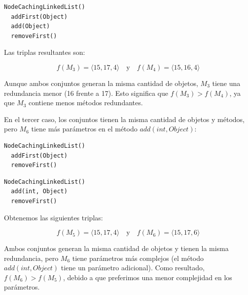 \begin{lstlisting}[numbers=none,label=fig:NCLbuilders4, caption=Conjunto de métodos \( M_4 \)]
  NodeCachingLinkedList()
  addFirst(Object)
  add(Object)
  removeFirst()
\end{lstlisting}

Las triplas resultantes son:

\[
f(M_3) = \langle 15, 17, 4 \rangle \quad \text{y} \quad f(M_4) = \langle 15, 16, 4 \rangle
\]

Aunque ambos conjuntos generan la misma cantidad de objetos, \( M_3 \) tiene una redundancia menor (16 frente a 17). Esto significa que \( f(M_3) > f(M_4) \), ya que \( M_3 \) contiene menos métodos redundantes.

En el tercer caso, los conjuntos tienen la misma cantidad de objetos y métodos, pero \( M_6 \) tiene más parámetros en el método \( add(int, Object) \):\\

\begin{lstlisting}[numbers=none,label=fig:NCLbuilders5, caption=Conjunto de métodos \( M_5 \)]
  NodeCachingLinkedList()
  addFirst(Object)
  removeFirst()
\end{lstlisting}

\begin{lstlisting}[numbers=none,label=fig:NCLbuilders6, caption=Conjunto de métodos \( M_6 \)]
  NodeCachingLinkedList()
  add(int, Object)
  removeFirst()
\end{lstlisting}

Obtenemos las siguientes triplas:

\[
f(M_5) = \langle 15, 17, 4 \rangle \quad \text{y} \quad f(M_6) = \langle 15, 17, 6 \rangle
\]

Ambos conjuntos generan la misma cantidad de objetos y tienen la misma redundancia, pero \( M_6 \) tiene parámetros más complejos (el método \( add(int, Object) \) tiene un parámetro adicional). Como resultado, \( f(M_6) > f(M_5) \), debido a que preferimos una menor complejidad en los parámetros.






